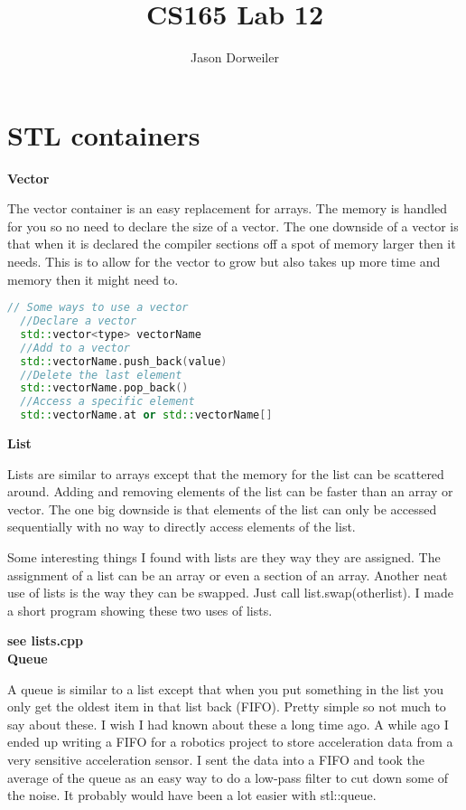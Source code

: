 \documentclass[a4paper,12pt]{article}
\title{CS165 Lab 12}
\author{Jason Dorweiler}
\begin{document}
\maketitle

\section{STL containers}

\textbf{Vector}

The vector container is an easy replacement for arrays.  The memory is handled for you so no need to declare the size of a vector.  The one downside of a vector is that when it is declared the compiler sections off a spot of memory larger then it needs.  This is to allow for the vector to grow but also takes up more time and memory then it might need to.

  \begin{lstlisting}[language=cpp,caption={Using Vectors}] 
  // Some ways to use a vector
  //Declare a vector
  std::vector<type> vectorName  
  //Add to a vector
  std::vectorName.push_back(value)
  //Delete the last element
  std::vectorName.pop_back()
  //Access a specific element
  std::vectorName.at or std::vectorName[]
  \end{lstlisting}

\textbf{List}

Lists are similar to arrays except that the memory for the list can be scattered around.  Adding and removing elements of the list can be faster than an array or vector.  The one big downside is that elements of the list can only be accessed sequentially with no way to directly access elements of the list.

Some interesting things I found with lists are they way they are assigned.  The assignment of a list can be an array or even a section of an array.  Another neat use of lists is the way they can be swapped.  Just call list.swap(otherlist).  I made a short program showing these two uses of lists. 

\textbf{see lists.cpp} \\


\textbf{Queue}

A queue is similar to a list except that when you put something in the list you only get the oldest item in that list back (FIFO).  Pretty simple so not much to say about these.  I wish I had known about these a long time ago.  A while ago I ended up writing a FIFO for a robotics project to store acceleration data from a very sensitive acceleration sensor. I sent the data into a FIFO and took the average of the queue as an easy way to do a low-pass filter to cut down some of the noise.  It probably would have been a lot easier with stl::queue. \\
\end{document}
